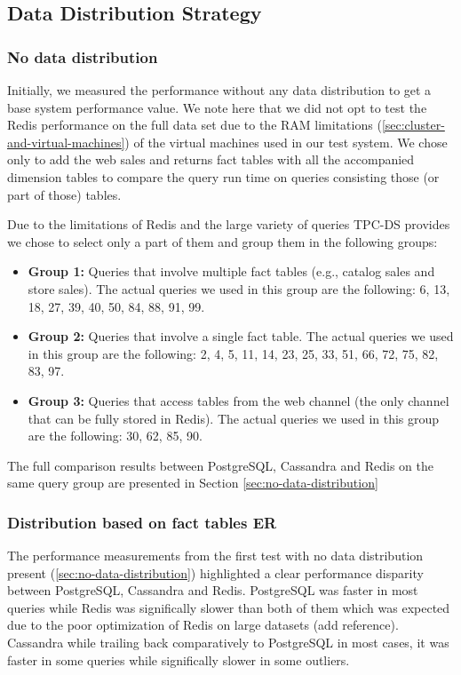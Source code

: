 \documentclass[conference]{IEEEtran}
\begin{document}
\subsection{Data Distribution Strategy}

\subsubsection{No data distribution}

Initially, we measured the performance without any data distribution to get a base system performance value. We note here that we did not opt to test the Redis performance on the full data set due to the RAM limitations (\ref{sec:cluster-and-virtual-machines}) of the virtual machines used in our test system. We chose only to add the web sales and returns fact tables with all the accompanied dimension tables to compare the query run time on queries consisting those (or part of those) tables.

Due to the limitations of Redis and the large variety of queries TPC-DS provides we chose to select only a part of them and group them in the following groups:

\begin{itemize}
	\item \textbf{Group 1:} Queries that involve multiple fact tables (e.g., catalog sales and store sales). The actual queries we used in this group are the following: 6, 13, 18, 27, 39, 40, 50, 84, 88, 91, 99.
	\item \textbf{Group 2:} Queries that involve a single fact table. The actual queries we used in this group are the following: 2, 4, 5, 11, 14, 23, 25, 33, 51, 66, 72, 75, 82, 83, 97.
	\item \textbf{Group 3:} Queries that access tables from the web channel (the only channel that can be fully stored in Redis). The actual queries we used in this group are the following: 30, 62, 85, 90.
\end{itemize}

The full comparison results between PostgreSQL, Cassandra and Redis on the same query group are presented in Section \ref{sec:no-data-distribution}

\subsubsection{Distribution based on fact tables ER}

The performance measurements from the first test with no data distribution present (\ref{sec:no-data-distribution}) highlighted a clear performance disparity between PostgreSQL, Cassandra and Redis. PostgreSQL was faster in most queries while Redis was significally slower than both of them which was expected due to the poor optimization of Redis on large datasets (add reference). Cassandra while trailing back comparatively to PostgreSQL in most cases, it was faster in some queries while significally slower in some outliers.  %
\end{document}
